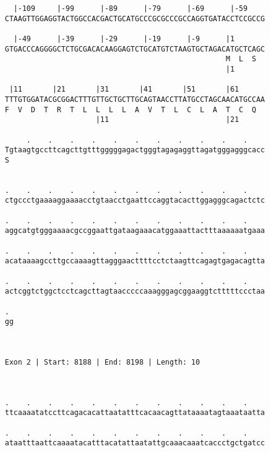 \documentclass{article}
\begin{document}
\begin{Verbatim}
  |-109     |-99      |-89      |-79      |-69      |-59    
CTAAGTTGGAGGTACTGGCCACGACTGCATGCCCGCGCCCGCCAGGTGATACCTCCGCCG
                                                            
  |-49      |-39      |-29      |-19      |-9      |1       
GTGACCCAGGGGCTCTGCGACACAAGGAGTCTGCATGTCTAAGTGCTAGACATGCTCAGC
                                                   M  L  S  
                                                   |1       
  
 |11       |21       |31       |41       |51       |61      
TTTGTGGATACGCGGACTTTGTTGCTGCTTGCAGTAACCTTATGCCTAGCAACATGCCAA
F  V  D  T  R  T  L  L  L  L  A  V  T  L  C  L  A  T  C  Q  
                     |11                           |21      
  
     .    .    .    .    .    .    .    .    .    .    .    
Tgtaagtgccttcagcttgtttgggggagactgggtagagaggttagatgggagggcacc
S                                                           
                                                            
  
.    .    .    .    .    .    .    .    .    .    .    .    
ctgccctgaaaaggaaaacctgtaacctgaattccaggtacacttggagggcagactctc
                                                            
.    .    .    .    .    .    .    .    .    .    .    .    
aggcatgtgggaaaacgccggaattgataagaaacatggaaattactttaaaaaatgaaa
                                                            
.    .    .    .    .    .    .    .    .    .    .    .    
acataaaagccttgccaaaagttagggaacttttcctctaagttcagagtgagacagtta
                                                            
.    .    .    .    .    .    .    .    .    .    .    .    
actcggtctggctcctcagcttagtaacccccaaagggagcggaaggtctttttccctaa
                                                            
. 
gg
  
  
 
Exon 2 | Start: 8188 | End: 8198 | Length: 10



.    .    .    .    .    .    .    .    .    .    .    .    
ttcaaaatatccttcagacacattaatatttcacaacagttataaaatagtaaataatta
                                                            
.    .    .    .    .    .    .    .    .    .    .    .    
ataatttaattcaaaatacatttacatattaatattgcaaacaaatcaccctgctgatcc
                                                            

\end{Verbatim}
\end{document}
